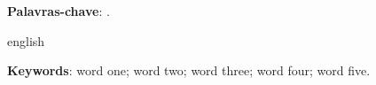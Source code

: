 
\begin{resumoumacoluna}

    \lipsum[1-3] %

    \vspace{\onelineskip}
    \noindent
    \textbf{Palavras-chave}:
    \ValorDasPalavrasChave{}.
\end{resumoumacoluna}

\renewcommand{\resumoname}{Abstract}
\begin{resumoumacoluna}
    \begin{otherlanguage*}{english}

        \lipsum[4-6]

        \vspace{\onelineskip}
        \noindent
        \textbf{Keywords}:
        word one; word two; word three; word four; word five.
    \end{otherlanguage*}
\end{resumoumacoluna}





